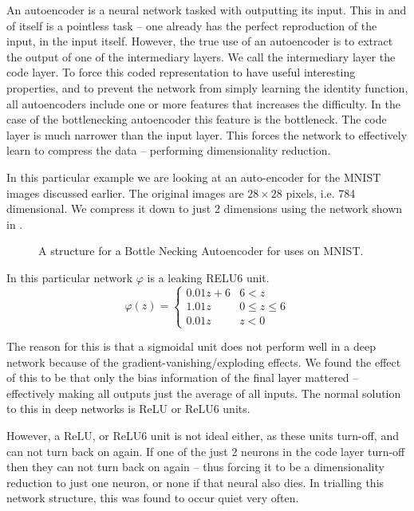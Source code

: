 \documentclass[12pt,parskip]{komatufte}
\begin{document}
An autoencoder is a neural network tasked with outputting its input.
This in and of itself is a pointless task -- one already has the perfect reproduction of the input, in the input itself.
However, the true use of an autoencoder is to extract the output of one of the intermediary layers.
We call the intermediary layer the code layer.
To force this coded representation to have useful interesting properties,
and to prevent the network from simply learning the identity function,
all autoencoders include one or more features that increases the difficulty.
In the case of the bottlenecking autoencoder this feature is the bottleneck.
The code layer is much narrower than the input layer.
This forces the network to effectively learn to compress the data -- performing dimensionality reduction.

In this particular example we are looking at an auto-encoder for the MNIST images discussed earlier.
The original images are $28 \times 28$ pixels, i.e. 784 dimensional.
We compress it down to just 2 dimensions using the network shown in .

\begin{figure}
	\caption{A structure for a Bottle Necking Autoencoder for uses on MNIST.}
	\label{fig-autoencoder}
	
\end{figure}


In this particular network $\varphi$ is a leaking RELU6 unit.
\begin{equation}
\varphi(z)=\begin{cases}
    0.01z+6 & 6<z \\
	1.01z & 0 \le z \le 6 \\
	0.01z & z < 0
\end{cases}
\end{equation}

The reason for this is that a sigmoidal unit does not perform well in a deep network because of the gradient-vanishing/exploding effects.
We found the effect of this to be that only the bias information of the final layer mattered -- effectively making all outputs just the average of all inputs.
The normal solution to this in deep networks is ReLU or ReLU6 units.

However, a ReLU, or ReLU6 unit is not ideal either,
as these units turn-off, and can not turn back on again.
If one of the just 2 neurons in the code layer turn-off then they can not turn back on again -- thus forcing it to be a dimensionality reduction to just one neuron, or none if that neural also dies.
In trialling this network structure, this was found to occur quiet very often.
\end{document}
